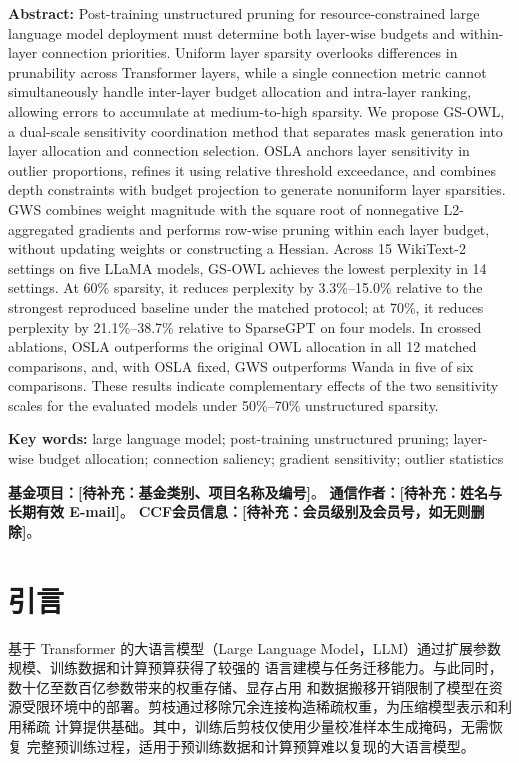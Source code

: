 \documentclass[UTF8,fontset=fandol]{ctexart}
\newcommand{\placeholder}[1]{\textbf{[待补充：#1]}}
\begin{document}
\vspace{4pt}
\noindent\textbf{Abstract:}
Post-training unstructured pruning for resource-constrained large language model deployment must determine both layer-wise budgets and within-layer connection priorities. Uniform layer sparsity overlooks differences in prunability across Transformer layers, while a single connection metric cannot simultaneously handle inter-layer budget allocation and intra-layer ranking, allowing errors to accumulate at medium-to-high sparsity. We propose GS-OWL, a dual-scale sensitivity coordination method that separates mask generation into layer allocation and connection selection. OSLA anchors layer sensitivity in outlier proportions, refines it using relative threshold exceedance, and combines depth constraints with budget projection to generate nonuniform layer sparsities. GWS combines weight magnitude with the square root of nonnegative L2-aggregated gradients and performs row-wise pruning within each layer budget, without updating weights or constructing a Hessian. Across 15 WikiText-2 settings on five LLaMA models, GS-OWL achieves the lowest perplexity in 14 settings. At 60\% sparsity, it reduces perplexity by 3.3\%--15.0\% relative to the strongest reproduced baseline under the matched protocol; at 70\%, it reduces perplexity by 21.1\%--38.7\% relative to SparseGPT on four models. In crossed ablations, OSLA outperforms the original OWL allocation in all 12 matched comparisons, and, with OSLA fixed, GWS outperforms Wanda in five of six comparisons. These results indicate complementary effects of the two sensitivity scales for the evaluated models under 50\%--70\% unstructured sparsity.

\noindent\textbf{Key words:}
large language model; post-training unstructured pruning; layer-wise budget allocation; connection saliency; gradient sensitivity; outlier statistics

\vspace{6pt}
\noindent{}
\textbf{基金项目：}\placeholder{基金类别、项目名称及编号}。\quad
\textbf{通信作者：}\placeholder{姓名与长期有效 E-mail}。\quad
\textbf{CCF会员信息：}\placeholder{会员级别及会员号，如无则删除}。
\vspace{4pt}
\endgroup
\vspace{8pt}

\section{引言}

基于 Transformer 的大语言模型（Large Language Model，LLM）通过扩展参数规模、训练数据和计算预算获得了较强的
语言建模与任务迁移能力\cite{llama,llama2,transformer}。与此同时，数十亿至数百亿参数带来的权重存储、显存占用
和数据搬移开销限制了模型在资源受限环境中的部署。剪枝通过移除冗余连接构造稀疏权重，为压缩模型表示和利用稀疏
计算提供基础\cite{obd,obs,han2015,deepcompression}。其中，训练后剪枝仅使用少量校准样本生成掩码，无需恢复
完整预训练过程，适用于预训练数据和计算预算难以复现的大语言模型。
\end{document}
